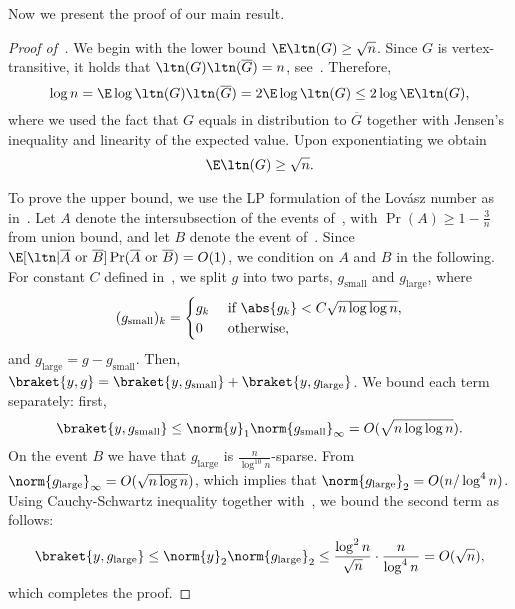 Now we present the proof of our main result.
\begin{proof}[Proof of~]
We begin with the lower bound \(\E \ltn(G) \geq \sqrt{n}\). Since \(G\) is vertex-transitive, it holds that \(\ltn(G) \ltn(\overline{G}) = n\), see~\cite[Theorem 8]{lovasz1979shannon}. Therefore,
\begin{equation}
    \log n = \E \log \ltn(G)\ltn(\overline{G}) = 2 \E \log \ltn(G) \leq 2 \log \E \ltn(G),
\end{equation}
where we used the fact that \(G\) equals in distribution to \(\overline{G}\) together with Jensen's inequality and linearity of the expected value. Upon exponentiating we obtain
\begin{equation}
    \E \ltn(G) \geq \sqrt{n}.
\end{equation}

    To prove the upper bound, we use the LP formulation of the Lovász number as in~. Let \(A\) denote the intersubsection of the events of~, with \(\Pr(A) \geq 1 - \frac{3}{n}\) from union bound, and let \(B\) denote the event of~. Since \(\E [\ltn \lvert \overline{A} \text{ or } \overline{B}] \Pr(\overline{A} \text{ or } \overline{B}) = O(1)\), we condition on \(A\) and \(B\) in the following. 
    For constant \(C\) defined in~, we split \(g\) into two parts, \(g_{\mathrm{small}}\) and \(g_{\mathrm{large}}\), where 
    \begin{equation}
    (g_{\mathrm{small}})_k = 
    \begin{cases} 
        g_k&\text{ if } \abs{g_k} < C \sqrt{n \log \log n}, \\
        0 &\text{ otherwise},
    \end{cases}
    \end{equation}
    and \(g_{\mathrm{large}} = g - g_{\mathrm{small}}\).
    Then, \(\braket{y, g} = \braket{y, g_{\mathrm{small}}} + \braket{y, g_{\mathrm{large}}}\). 
    We bound each term separately: first,
    \begin{equation}
        \braket{y, g_{\mathrm{small}}} \leq \norm{y}_1  \norm{g_{\mathrm{small}}}_{\infty} = O(\sqrt{n \log \log n}).
    \end{equation}
    On the event \(B\) we have that \(g_{\mathrm{large}}\) is \(\frac{n}{\log^{10} n}\)-sparse. 
    From~ \(\norm{g_{\mathrm{large}}}_{\infty} = O(\sqrt{n \log n })\), which implies that \(\norm{g_{\mathrm{large}}}_2 = O(n / \log^4 n)\). Using Cauchy-Schwartz inequality together with~, we bound the second term as follows:
    \begin{equation}
        \braket{y, g_{\mathrm{large}}} \leq \norm{y}_2 \norm{g_{\mathrm{large}}}_{2} \leq \frac{\log^2 n }{\sqrt{n}} \cdot \frac{n}{\log^4 n}= O(\sqrt{n}),
    \end{equation}
    which completes the proof.
\end{proof}